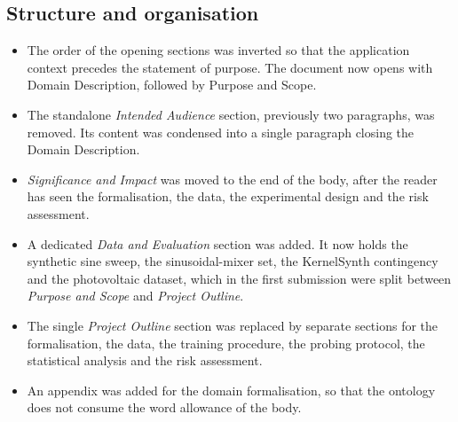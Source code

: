 \subsection{Structure and organisation}
\begin{itemize}
  \item The order of the opening sections was inverted so that the application
        context precedes the statement of purpose. The document now opens with
        Domain Description, followed by Purpose and Scope.
  \item The standalone \emph{Intended Audience} section, previously two
        paragraphs, was removed. Its content was condensed into a single
        paragraph closing the Domain Description.
  \item \emph{Significance and Impact} was moved to the end of the body, after
        the reader has seen the formalisation, the data, the experimental
        design and the risk assessment.
  \item A dedicated \emph{Data and Evaluation} section was added. It now holds
        the synthetic sine sweep, the sinusoidal-mixer set, the KernelSynth
        contingency and the photovoltaic dataset, which in the first submission
        were split between \emph{Purpose and Scope} and \emph{Project Outline}.
  \item The single \emph{Project Outline} section was replaced by separate
        sections for the formalisation, the data, the training procedure, the
        probing protocol, the statistical analysis and the risk assessment.
  \item An appendix was added for the domain formalisation, so that the
        ontology does not consume the word allowance of the body.
\end{itemize}


